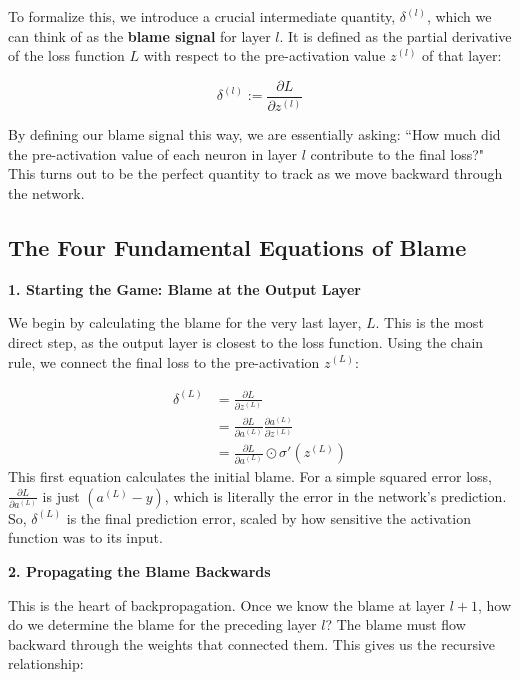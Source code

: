 \documentclass{article}
\begin{document}
To formalize this, we introduce a crucial intermediate quantity, $\delta^{(l)}$, which we can think of as the \textbf{blame signal} for layer $l$. It is defined as the partial derivative of the loss function $L$ with respect to the pre-activation value $z^{(l)}$ of that layer:

\begin{equation}
    \delta^{(l)} := \frac{\partial L}{\partial z^{(l)}}
\end{equation}

By defining our blame signal this way, we are essentially asking: ``How much did the pre-activation value of each neuron in layer $l$ contribute to the final loss?" This turns out to be the perfect quantity to track as we move backward through the network.

\subsection{The Four Fundamental Equations of Blame}

\textbf{1. Starting the Game: Blame at the Output Layer}

We begin by calculating the blame for the very last layer, $L$. This is the most direct step, as the output layer is closest to the loss function. Using the chain rule, we connect the final loss to the pre-activation $z^{(L)}$:

\begin{align}
    \delta^{(L)} &= \frac{\partial L}{\partial z^{(L)}} \\
    &= \frac{\partial L}{\partial a^{(L)}} \frac{\partial a^{(L)}}{\partial z^{(L)}} \nonumber \\
    &= \frac{\partial L}{\partial a^{(L)}} \odot \sigma'(z^{(L)}) \label{eq:bp1}
\end{align}
This first equation calculates the initial blame. For a simple squared error loss, $\frac{\partial L}{\partial a^{(L)}}$ is just $(a^{(L)} - y)$, which is literally the error in the network's prediction. So, $\delta^{(L)}$ is the final prediction error, scaled by how sensitive the activation function was to its input.

\textbf{2. Propagating the Blame Backwards}

This is the heart of backpropagation. Once we know the blame at layer $l+1$, how do we determine the blame for the preceding layer $l$? The blame must flow backward through the weights that connected them. This gives us the recursive relationship:
\end{document}
